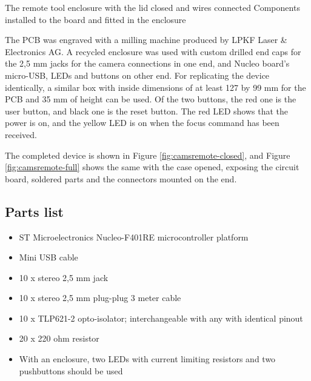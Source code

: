 {The remote tool enclosure with the lid closed and wires connected}
{Components installed to the board and fitted in the enclosure}

The PCB was engraved with a milling machine produced by LPKF Laser \& Electronics AG.
A recycled enclosure was used with custom drilled end caps for the 2,5 mm jacks for the camera connections in one end, and Nucleo board's micro-USB, LEDs and buttons on other end.
For replicating the device identically, a similar box with inside dimensions of at least 127 by 99 mm for the PCB and 35 mm of height can be used.
Of the two buttons, the red one is the user button, and black one is the reset button.
The red LED shows that the power is on, and the yellow LED is on when the focus command has been received.

The completed device is shown in Figure \ref{fig:camsremote-closed}, and Figure \ref{fig:camsremote-full} shows the same with the case opened, exposing the circuit board, soldered parts and the connectors mounted on the end.



\subsection{Parts list}

\begin{itemize}
	\item ST Microelectronics Nucleo-F401RE microcontroller platform
	\item Mini USB cable
	\item 10 x stereo 2,5 mm jack
	\item 10 x stereo 2,5 mm plug-plug 3 meter cable
	\item 10 x TLP621-2 opto-isolator; interchangeable with any with identical pinout
	\item 20 x 220 ohm resistor
	\item With an enclosure, two LEDs with current limiting resistors and two pushbuttons should be used
\end{itemize}
